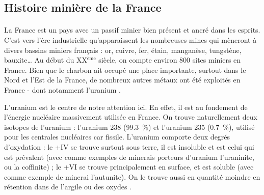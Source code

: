 \documentclass{article}
\begin{document}
\subsection{Histoire minière de la France}

\paragraph{} La France est un pays avec un passif minier bien présent et ancré dans les esprits. C’est vers l’ère industrielle qu’apparaissent les nombreuses mines qui mèneront à divers bassins miniers français : or, cuivre, fer, étain, manganèse, tungstène, bauxite… Au début du XX$^\text{ème}$ siècle, on compte environ 800 sites miniers en France. Bien que le charbon ait occupé une place importante, surtout dans le Nord et l'Est de la France, de nombreux autres métaux ont été exploités en France - dont notamment l’uranium \cite{ledoux_notions_2020}. 



L’uranium est le centre de notre attention ici. En effet, il est au fondement de l’énergie nucléaire massivement utilisée en France. On trouve naturellement deux isotopes de l'uranium : l'uranium 238 (99.3~\%) et l'uranium 235 (0.7~\%), utilisé pour les centrales nucléaires car fissile. L'uranium comporte deux degrés d’oxydation : le +IV se trouve surtout sous terre, il est insoluble et est celui qui est prévalent (avec comme exemples de minerais porteurs d'uranium l'uraninite, ou la coffinite) ; le +VI se trouve principalement en surface, et est soluble (avec comme exemple de minerai l'autunite). On le trouve aussi en quantité moindre en rétention dans de l’argile ou des oxydes \cite{descostes_introduction_2020}.
\end{document}
